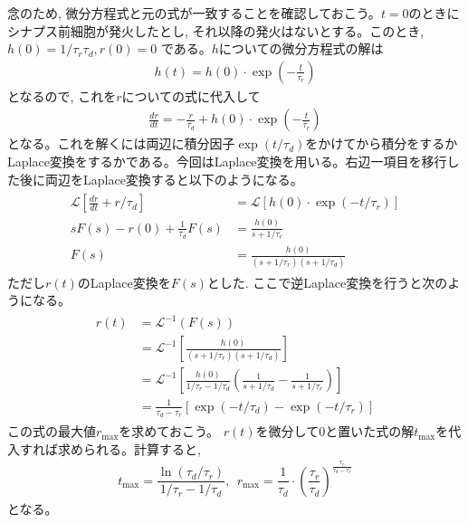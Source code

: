 \documentclass[letterpaper,10pt,english]{sphinxmanual}
\begin{document}
念のため, 微分方程式と元の式が一致することを確認しておこう。\(t=0\)のときにシナプス前細胞が発火したとし, それ以降の発火はないとする。このとき, \(h(0)=1/\tau_{r}\tau_{d}, r(0)=0\) である。\(h\)についての微分方程式の解は
\begin{equation*}
\begin{split}
\begin{equation}
h(t)=h(0)\cdot \exp\left(-\frac{t}{\tau_r}\right)    
\end{equation}
\end{split}
\end{equation*}
となるので, これを\(r\)についての式に代入して
\begin{equation*}
\begin{split}
\begin{equation}
\frac{dr}{dt}=-\frac{r}{\tau_{d}}+h(0)\cdot \exp\left(-\frac{t}{\tau_r}\right) 
\end{equation}
\end{split}
\end{equation*}
となる。これを解くには両辺に積分因子\(\exp({t}/{\tau_d})\)をかけてから積分をするかLaplace変換をするかである。今回はLaplace変換を用いる。右辺一項目を移行した後に両辺をLaplace変換すると以下のようになる。
\begin{equation*}
\begin{split}
\begin{align}
\mathcal{L}\left[\frac{dr}{dt}+r/\tau_{d}\right]&=\mathcal{L}\left[h(0)\cdot \exp\left(-t/\tau_r\right)\right]\\
sF(s)-r(0)+\frac{1}{\tau_{d}}F(s)&=\frac{h(0)}{s+1/\tau_r}\\
F(s)&=\frac{h(0)}{(s+1/\tau_r)(s+1/\tau_d)}
\end{align}
\end{split}
\end{equation*}
ただし\(r(t)\)のLaplace変換を\(F(s)\)とした. ここで逆Laplace変換を行うと次のようになる。
\begin{equation*}
\begin{split}
\begin{align}
r(t)&=\mathcal{L}^{-1}(F(s))\\
&=\mathcal{L}^{-1}\left[\frac{h(0)}{(s+1/\tau_r)(s+1/\tau_d)}\right]\\
&=\mathcal{L}^{-1}\left[\frac{h(0)}{1/\tau_r-1/\tau_d}\left(\frac{1}{s+1/\tau_d}-\frac{1}{s+1/\tau_r}\right)\right]\\
&=\frac{1}{\tau_d-\tau_r}\left[\exp(-t/\tau_d)-\exp(-t/\tau_r)\right]
\end{align}
\end{split}
\end{equation*}
この式の最大値\(r_{\max}\)を求めておこう。 \(r(t)\)を微分して0と置いた式の解\(t_{\max}\)を代入すれば求められる。計算すると,
\begin{equation*}
\begin{split}
\begin{equation}
t_{\max}=\dfrac{\ln(\tau_d/\tau_r)}{1/\tau_r-1/\tau_d},\ \ r_{\max}=\dfrac{1}{\tau_{d}}\cdot \left(\dfrac{\tau_{r}}{\tau_{d}}\right)^{\frac{\tau_{r}}{\tau_d-\tau_{r}}}    
\end{equation}
\end{split}
\end{equation*}
となる。
\end{document}
